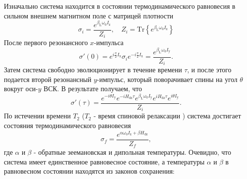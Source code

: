 \documentclass[utf8]{jetp}
\begin{document}
Изначально система находится в состоянии термодинамического равновесия в сильном внешнем магнитном поле с матрицей плотности
%
\begin{equation}
  \label{eq:a1}
  \sigma_{i} = \dfrac{e^{\beta_\mathrm{L} \omega_{0} I_\mathrm{z}}}{Z_{i}} ,
  \quad
  Z_{i} = \mathrm{Tr}\left\{e^{\beta_\mathrm{L} \omega_{0} I_\mathrm{z}} \right\}
\end{equation}
%
После первого резонансного $x$-импульса
%
\begin{equation}
  \label{eq:a2}
  \sigma'(0) = e^{ i \frac \pi 2 I_\mathrm{x}}
  \sigma_{i}
  e^{-i \frac \pi 2 I_\mathrm{x}}
  = \dfrac{e^{\beta_\mathrm{L} \omega_{0} I_\mathrm{y}}}{Z_{i}} .
\end{equation}
%
Затем система свободно эволюционирует в течение времени $\tau$,
и после этого подается второй резонансный $y$-импульс, который поворачивает спины на угол $\theta$ вокруг оси-$y$ ВСК.
В результате получаем, что
\begin{equation}
  \label{eq:a3}
  \sigma'(\tau)
  = \dfrac{
   e^{-i \theta I_\mathrm{y}} e^{-i H_\mathrm{dz} \tau}
   e^{\beta_\mathrm{L} \omega_{0} I_\mathrm{y}}
   e^{i H_\mathrm{dz} \tau} e^{i \theta I_\mathrm{y}}
  }{Z_{i}}.
\end{equation}
%
По истечении времени $T_2$ ($T_2$ - время спиновой релаксации \cite{Goldman_1970}) система достигает состояния термодинамического равновесия
\begin{equation}
  \label{eq:a4}
  \sigma_{f}
  = \dfrac{ e^{\alpha \omega_{0} I_\mathrm{z} + \beta H_\mathrm{dz}} }{Z_f},
\end{equation}
%
где $\alpha$ и $\beta$ - обратные зеемановская и дипольная температуры.
Очевидно, что система имеет единственное  равновесное состояние, а
 температуры $\alpha$ и $\beta$ в равновесном состоянии находятся из
законов сохранения:
\end{document}
